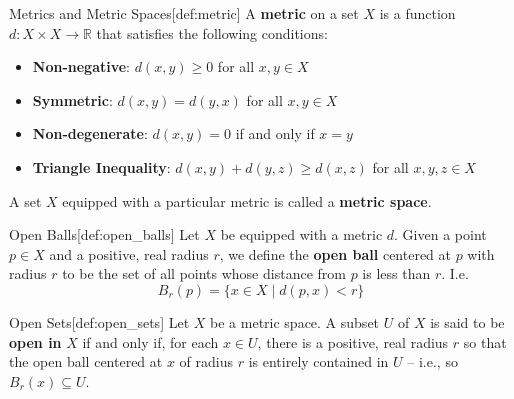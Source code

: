 \begin{defBox}{Metrics and Metric Spaces}[def:metric]
    A \textbf{metric} on a set \( X \) is a function 
    \( d: X \times X \rightarrow \mathbb{R} \) that satisfies the following 
    conditions: 
    \begin{itemize}
        \item \textbf{Non-negative}:
            \( d( x, y ) \geq 0 \) for all \( x, y \in X \)
        \item \textbf{Symmetric}:
            \( d( x, y ) = d( y, x ) \) for all \( x, y \in X \)
        \item \textbf{Non-degenerate}: 
            \( d( x, y ) = 0 \) if and only if \( x = y \)
        \item \textbf{Triangle Inequality}: 
            \( d( x, y ) + d( y, z ) \geq d( x, z ) \) for all 
            \( x, y, z \in X \)
    \end{itemize} 
    A set \( X \) equipped with a particular metric is called a 
    \textbf{metric space}. 
\end{defBox}

\begin{defBox}{Open Balls}[def:open_balls]
    Let \( X \) be equipped with a metric \( d \). Given a point \( p \in X \)
    and a positive, real radius \( r \), we define the \textbf{open ball} 
    centered at \( p \) with radius \( r \) to be the set of all points whose 
    distance from \( p \) is less than \( r \). I.e. 
    \begin{equation*}
        B_{ r }( p ) 
        =
        \{ x \in X \mid d( p, x ) < r \}
    \end{equation*}
\end{defBox}

\begin{defBox}{Open Sets}[def:open_sets]
    Let \( X \) be a metric space. A subset \( U \) of \( X \) is said to be 
    \textbf{open in} \( X \) if and only if, for each \( x \in U \), there is a 
    positive, real radius \( r \) so that the open ball centered at \( x \) of 
    radius \( r \) is entirely contained in \( U \) -- i.e., so 
    \( B_{ r }( x ) \subseteq U \).
\end{defBox}
